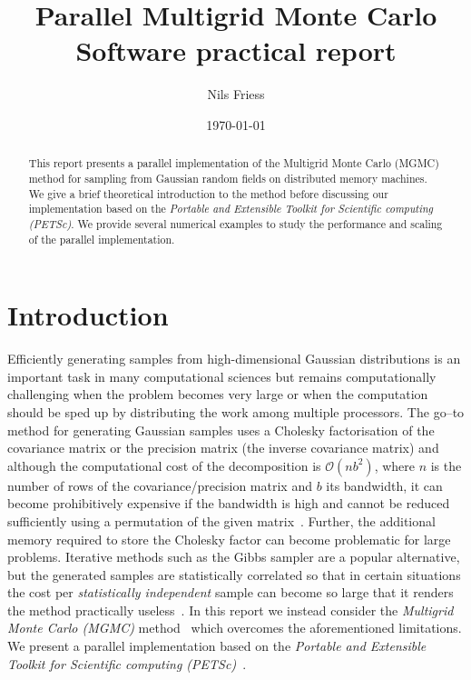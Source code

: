 \documentclass[
fontsize=11pt,
paper=a4,
numbers=noenddot
]{scrartcl}
\title{Parallel Multigrid Monte Carlo\\
{\normalsize Software practical report}}
\date{\today}
\author{Nils Friess}
\begin{document}
\maketitle

\begin{abstract}
    This report presents a parallel implementation of the Multigrid Monte Carlo (MGMC) method for sampling from Gaussian random fields on distributed memory machines. 
    We give a brief theoretical introduction to the method before discussing our implementation based on the \emph{Portable and Extensible Toolkit for Scientific computing (PETSc)}. We provide several numerical examples to study the performance and scaling of the parallel implementation.
\end{abstract}

\section{Introduction}
Efficiently generating samples from high-dimensional Gaussian distributions is an important task in many computational sciences but remains computationally challenging when the problem becomes very large
or when the computation should be sped up by distributing the work among multiple processors. The go--to method for generating Gaussian samples uses a Cholesky factorisation of the covariance matrix or the precision matrix (the inverse covariance matrix) and although the computational cost of the decomposition is $\mathcal{O}(nb^2)$, where $n$ is the number of rows of the covariance/precision matrix and $b$ its bandwidth, it can become prohibitively expensive if the bandwidth is high and cannot be reduced sufficiently using a permutation of the given matrix~\cite{golubvanloan,rue2001fast,foxparker}. Further, the additional memory required to store the Cholesky factor can become problematic for large problems. Iterative methods such as the Gibbs sampler are a popular alternative, but the generated samples are statistically correlated so that in certain situations the cost per \emph{statistically independent} sample can become so large that it renders the method practically useless~\cite{foxparker,kazashimuellerscheichl}. In this report we instead consider the \emph{Multigrid Monte Carlo (MGMC)} method~\cite{goodmansokal} which overcomes the aforementioned limitations. We present a parallel implementation based on the \emph{Portable and Extensible Toolkit for Scientific computing (PETSc)}~\cite{petsc-web-page,petsc-user-ref}.
\end{document}
